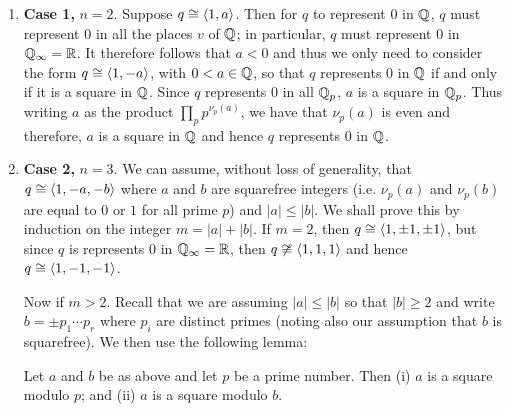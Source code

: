 \begin{enumerate}[wide, nosep, label=(\alph*)]
    \item \textbf{Case 1,} \(n = 2\). Suppose \(q \cong \langle 1, a \rangle\). Then for \(q\) to represent \(0\) in \(\mathbb{Q}\), \(q\) must represent \(0\) in all the places \(v\) of \(\mathbb{Q}\); in particular, \(q\) must represent \(0\) in \(\mathbb{Q}_{\infty} = \mathbb{R}\). It therefore follows that \(a < 0\) and thus we only need to consider the form \(q \cong \langle 1, -a \rangle\), with \(0 < a \in \mathbb{Q}\), so that \(q\) represents \(0\) in \(\mathbb{Q}\) if and only if it is a square in \(\mathbb{Q}\). Since \(q\) represents \(0\) in all \(\mathbb{Q}_p\),  \(a\) is a square in \(\mathbb{Q}_p\). Thus writing \(a\) as the product \(\prod_p p^{\nu_p(a)}\), we have that \(\nu_p(a)\) is even and therefore, \(a\) is a square in \(\mathbb{Q}\) and hence \(q\) represents \(0\) in \(\mathbb{Q}\).
    
    \item \textbf{Case 2,} \(n = 3\). We can assume, without loss of generality, that \(q \cong \langle 1, -a, -b \rangle\) where \(a\) and \(b\) are squarefree integers (i.e. \(\nu_p(a)\) and \(\nu_p(b)\) are equal to \(0\) or \(1\) for all prime \(p\)) and \(|a| \leq |b|\). We shall prove this by induction on the integer \(m = |a| + |b|\). If \(m = 2\), then \(q \cong \langle 1, \pm 1, \pm 1 \rangle\), but since \(q\) is represents 0 in \(\mathbb{Q}_\infty = \mathbb{R}\), then \(q \not\cong \langle 1, 1, 1 \rangle\) and hence \(q \cong \langle 1, -1, -1 \rangle\).
    
    Now if \(m > 2\). Recall that we are assuming \(|a| \leq |b|\) so that \(|b| \geq 2\) and write \(b = \pm p_1 \cdots p_r\) where \(p_i\) are distinct primes (noting also our assumption that \(b\) is squarefree). We then use the following lemma:

    \begin{lemma}
        Let \(a\) and \(b\) be as above and let \(p\) be a prime number. Then {\normalfont (i)} \(a\) is a square modulo \(p\); and {\normalfont (ii)} \(a\) is a square modulo \(b\).
    \end{lemma}


\end{enumerate}
